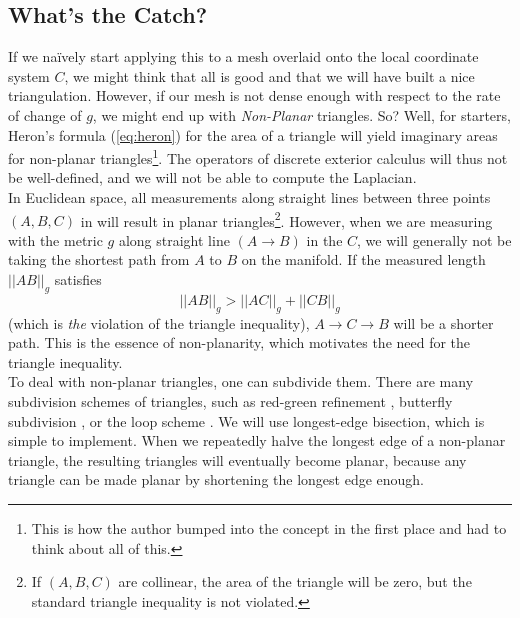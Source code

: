 \subsection*{What's the Catch?}
If we naïvely start applying this to a mesh overlaid onto the local coordinate system $C$, we might think that all is good and that we will have built a nice triangulation. However, if our mesh is not dense enough with respect to the rate of change of $g$, we might end up with \textit{Non-Planar} triangles.
So? Well, for starters, Heron's formula (\ref{eq:heron}) for the area of a triangle will yield imaginary areas for non-planar triangles\footnote{This is how the author bumped into the concept in the first place and had to think about all of this.}. The operators of discrete exterior calculus will thus not be well-defined, and we will not be able to compute the Laplacian.
\\
In Euclidean space, all measurements along straight lines between three points $(A, B, C)$ in will result in planar triangles\footnote{If $(A, B, C)$ are collinear, the area of the triangle will be zero, but the standard triangle inequality is not violated.}. However, when we are measuring with the metric $g$ along straight line $(A \to B)$ in the $C$, we will generally not be taking the shortest path from $A$ to $B$ on the manifold. If the measured length $||AB||_g$ satisfies
$$||AB||_g > ||AC||_g + ||CB||_g$$
(which is \textit{the} violation of the triangle inequality), $A \to C \to B$ will be a shorter path. This is the essence of non-planarity, which motivates the need for the triangle inequality.
\\
To deal with non-planar triangles, one can subdivide them. There are many subdivision schemes of triangles, such as red-green refinement \cite{puppo2008rgbdivision}, butterfly subdivision \cite{dyn1990butterflydivision}, or the loop scheme \cite{loop1987smoothloopdivision}. We will use longest-edge bisection\cite{longest_edge_bisection}, which is simple to implement. When we repeatedly halve the longest edge of a non-planar triangle, the resulting triangles will eventually become planar, because any triangle can be made planar by shortening the longest edge enough.

